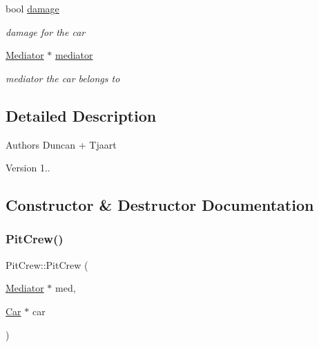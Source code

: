 \begin{DoxyCompactItemize}
\mbox{\label{class_pit_crew_aa87241e1f87a430e1a92ed7010ccf554}} 
bool \mbox{\hyperlink{class_pit_crew_aa87241e1f87a430e1a92ed7010ccf554}{damage}}
\begin{DoxyCompactList}\small\item\em damage for the car \end{DoxyCompactList}\item 
\mbox{\label{class_pit_crew_a2025059ebb3b14eb3ada6723b5364157}} 
\mbox{\hyperlink{class_mediator}{Mediator}} $\ast$ \mbox{\hyperlink{class_pit_crew_a2025059ebb3b14eb3ada6723b5364157}{mediator}}
\begin{DoxyCompactList}\small\item\em mediator the car belongs to \end{DoxyCompactList}\end{DoxyCompactItemize}


\subsection{Detailed Description}
\begin{DoxyAuthor}{Authors}
Duncan + Tjaart 
\end{DoxyAuthor}
\begin{DoxyVersion}{Version}
1.. 
\end{DoxyVersion}


\subsection{Constructor \& Destructor Documentation}
\mbox{\label{class_pit_crew_a49409297eb8e8b28ba1631858358f3de}} 
\subsubsection{\texorpdfstring{Pit\+Crew()}{PitCrew()}}
{\footnotesize\ttfamily Pit\+Crew\+::\+Pit\+Crew (\begin{DoxyParamCaption}\item[{\mbox{\hyperlink{class_mediator}{Mediator}} $\ast$}]{med,  }\item[{\mbox{\hyperlink{class_car}{Car}} $\ast$}]{car }\end{DoxyParamCaption})}

